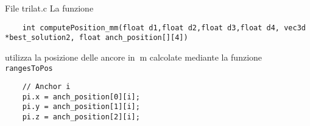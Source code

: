 \begin{frame}[fragile]{File trilat.c}
  La funzione
  \begin{lstlisting}
    int computePosition_mm(float d1,float d2,float d3,float d4, vec3d *best_solution2, float anch_position[][4])
  \end{lstlisting}
  utilizza la posizione delle ancore in $\SI{}{\meter}$ calcolate mediante la funzione \lstinline!rangesToPos!
  \begin{lstlisting}
    // Anchor i
    pi.x = anch_position[0][i];
    pi.y = anch_position[1][i];
    pi.z = anch_position[2][i];
  \end{lstlisting}
\end{frame}
  

